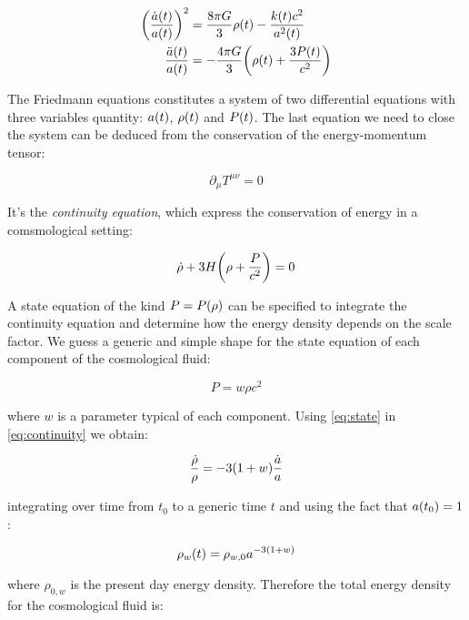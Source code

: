 \begin{align}
        \qty(\frac{\dot a\qty(t)}{a\qty(t)})^2 & = \frac{8\pi G}{3} \rho\qty(t)
        - \frac{k\qty(t) c^2}{a^2\qty(t)}
        \label{eq:friedmann_1} \\
        \frac{\ddot a\qty(t)}{a\qty(t)} & = -\frac{4\pi G}{3}
        \qty(\rho\qty(t) + \frac{3 P\qty(t)}{c^2})
        \label{eq:friedmann_2}
\end{align}

The Friedmann equations constitutes a system of two differential equations
with three variables quantity: $a\qty(t)$, $\rho\qty(t)$ and $P\qty(t)$.
The last equation we need to close the system can be deduced from the
conservation of the energy-momentum tensor:

\begin{equation}
        \partial_\mu T^{\mu \nu} = 0
\end{equation}

It's the \emph{continuity equation}, which express the conservation of energy in a
comsmological setting:

\begin{equation}
        \dot \rho + 3 H \qty(\rho + \frac{P}{c^2}) = 0
        \label{eq:continuity}
\end{equation}

A state equation of the kind $P = P\qty(\rho)$ can be specified to
integrate the continuity equation and determine how the energy density
depends on the scale factor. We guess a generic and simple shape for the
state equation of each component of the cosmological fluid:

\begin{equation}
        P = w \rho c^2
        \label{eq:state}
\end{equation}

where $w$ is a parameter typical of each component.
Using \autoref{eq:state} in \autoref{eq:continuity} we obtain:

\begin{equation}
        \frac{\dot \rho}{\rho} = -3\qty(1 + w) \frac{\dot a}{a}
\end{equation}

integrating over time from $t_0$ to a generic time $t$ and using the fact
that $a\qty(t_0) = 1$:

\begin{equation}
        \rho_w\qty(t) = \rho_{w,0} a^{-3\qty(1 + w)}
\end{equation}

where $\rho_{0,w}$ is the present day energy density.
Therefore the total energy density for the cosmological fluid is:

